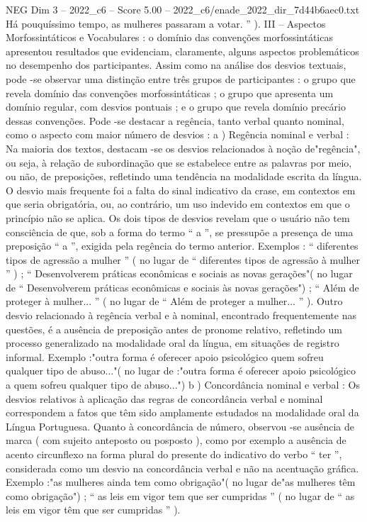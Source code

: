 \begin{textsample}{NEG Dim 3 – 2022\_c6 – Score 5.00 – 2022\_c6/enade\_2022\_dir\_7d44b6aec0.txt}
Há pouquíssimo tempo, as mulheres passaram a votar. ” ).
III – Aspectos Morfossintáticos e Vocabulares : o domínio das convenções morfossintáticas apresentou resultados que evidenciam, claramente, alguns aspectos problemáticos no desempenho dos participantes.
Assim como na análise dos desvios textuais, pode -se observar uma distinção entre três grupos de participantes : o grupo que revela domínio das convenções morfossintáticas ; o grupo que apresenta um domínio regular, com desvios pontuais ; e o grupo que revela domínio precário dessas convenções.
Pode -se destacar a regência, tanto verbal quanto nominal, como o aspecto com maior número de desvios : a ) Regência nominal e verbal : Na maioria dos textos, destacam -se os desvios relacionados à noção de"regência", ou seja, à relação de subordinação que se estabelece entre as palavras por meio, ou não, de preposições, refletindo uma tendência na modalidade escrita da língua.
O desvio mais frequente foi a falta do sinal indicativo da crase, em contextos em que seria obrigatória, ou, ao contrário, um uso indevido em contextos em que o princípio não se aplica.
Os dois tipos de desvios revelam que o usuário não tem consciência de que, sob a forma do termo “ a ”, se pressupõe a presença de uma preposição “ a ”, exigida pela regência do termo anterior.
Exemplos : “ diferentes tipos de agressão a mulher ” ( no lugar de “ diferentes tipos de agressão à mulher ” ) ; “ Desenvolverem práticas econômicas e sociais as novas gerações"( no lugar de “ Desenvolverem práticas econômicas e sociais às novas gerações") ; “ Além de proteger à mulher... ” ( no lugar de “ Além de proteger a mulher... ” ).
Outro desvio relacionado à regência verbal e à nominal, encontrado frequentemente nas questões, é a ausência de preposição antes de pronome relativo, refletindo um processo generalizado na modalidade oral da língua, em situações de registro informal.
Exemplo :"outra forma é oferecer apoio psicológico quem sofreu qualquer tipo de abuso..."( no lugar de :"outra forma é oferecer apoio psicológico a quem sofreu qualquer tipo de abuso...") b ) Concordância nominal e verbal : Os desvios relativos à aplicação das regras de concordância verbal e nominal correspondem a fatos que têm sido amplamente estudados na modalidade oral da Língua Portuguesa.
Quanto à concordância de número, observou -se ausência de marca ( com sujeito anteposto ou posposto ), como por exemplo a ausência de acento circunflexo na forma plural do presente do indicativo do verbo “ ter ”, considerada como um desvio na concordância verbal e não na acentuação gráfica.
Exemplo :"as mulheres ainda tem como obrigação"( no lugar de"as mulheres têm como obrigação") ; “ as leis em vigor tem que ser cumpridas ” ( no lugar de “ as leis em vigor têm que ser cumpridas ” ).

\end{textsample}
